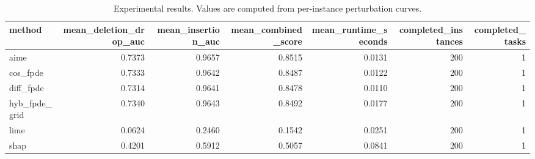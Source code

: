 \begin{table}[t]
\caption{Experimental results. Values are computed from per-instance perturbation curves.}
\label{tab:main_results_computed}
\centering
\begin{tabular}{lrrrrrr}
\toprule
method & mean\_deletion\_drop\_auc & mean\_insertion\_auc & mean\_combined\_score & mean\_runtime\_seconds & completed\_instances & completed\_tasks \\
\midrule
aime & 0.7373 & 0.9657 & 0.8515 & 0.0131 & 200 & 1 \\
cos\_fpde & 0.7333 & 0.9642 & 0.8487 & 0.0122 & 200 & 1 \\
diff\_fpde & 0.7314 & 0.9641 & 0.8478 & 0.0110 & 200 & 1 \\
hyb\_fpde\_grid & 0.7340 & 0.9643 & 0.8492 & 0.0177 & 200 & 1 \\
lime & 0.0624 & 0.2460 & 0.1542 & 0.0251 & 200 & 1 \\
shap & 0.4201 & 0.5912 & 0.5057 & 0.0841 & 200 & 1 \\
\bottomrule
\end{tabular}

\end{table}
